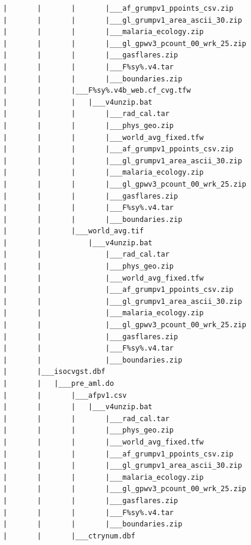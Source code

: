 \documentclass[]{book}
\begin{document}
\begin{verbatim}
            |       |       |       |___af_grumpv1_ppoints_csv.zip
            |       |       |       |___gl_grumpv1_area_ascii_30.zip
            |       |       |       |___malaria_ecology.zip
            |       |       |       |___gl_gpwv3_pcount_00_wrk_25.zip
            |       |       |       |___gasflares.zip
            |       |       |       |___F%sy%.v4.tar
            |       |       |       |___boundaries.zip
            |       |       |___F%sy%.v4b_web.cf_cvg.tfw
            |       |       |   |___v4unzip.bat
            |       |       |       |___rad_cal.tar
            |       |       |       |___phys_geo.zip
            |       |       |       |___world_avg_fixed.tfw
            |       |       |       |___af_grumpv1_ppoints_csv.zip
            |       |       |       |___gl_grumpv1_area_ascii_30.zip
            |       |       |       |___malaria_ecology.zip
            |       |       |       |___gl_gpwv3_pcount_00_wrk_25.zip
            |       |       |       |___gasflares.zip
            |       |       |       |___F%sy%.v4.tar
            |       |       |       |___boundaries.zip
            |       |       |___world_avg.tif
            |       |           |___v4unzip.bat
            |       |               |___rad_cal.tar
            |       |               |___phys_geo.zip
            |       |               |___world_avg_fixed.tfw
            |       |               |___af_grumpv1_ppoints_csv.zip
            |       |               |___gl_grumpv1_area_ascii_30.zip
            |       |               |___malaria_ecology.zip
            |       |               |___gl_gpwv3_pcount_00_wrk_25.zip
            |       |               |___gasflares.zip
            |       |               |___F%sy%.v4.tar
            |       |               |___boundaries.zip
            |       |___isocvgst.dbf
            |       |   |___pre_aml.do
            |       |       |___afpv1.csv
            |       |       |   |___v4unzip.bat
            |       |       |       |___rad_cal.tar
            |       |       |       |___phys_geo.zip
            |       |       |       |___world_avg_fixed.tfw
            |       |       |       |___af_grumpv1_ppoints_csv.zip
            |       |       |       |___gl_grumpv1_area_ascii_30.zip
            |       |       |       |___malaria_ecology.zip
            |       |       |       |___gl_gpwv3_pcount_00_wrk_25.zip
            |       |       |       |___gasflares.zip
            |       |       |       |___F%sy%.v4.tar
            |       |       |       |___boundaries.zip
            |       |       |___ctrynum.dbf

\end{verbatim}
\end{document}
